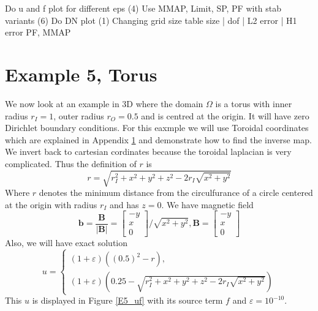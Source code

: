 \documentclass[12pt,a4paper]{article}
\begin{document}
Do u and f plot for different eps (4)
Use MMAP, Limit, SP, PF
with stab variants (6)
Do DN plot (1)
Changing grid size table 
size | dof | L2 error | H1 error PF, MMAP

\section{Example 5, Torus}
We now look at an example in 3D where the domain $\Omega $ is a torus with inner radius $r_I = 1$, outer radius $r_O = 0.5$ and is centred at the origin. It will have zero Dirichlet boundary conditions. For this eaxmple we will use Toroidal coordinates which are explained in Appendix \ref{} and demonstrate how to find the inverse map. We invert back to cartesian cordinates because the toroidal laplacian \cite{} is very complicated. Thus the definition of $r$ is
\begin{equation}
r = \sqrt{r_I^2 + x^2 + y^2 + z^2 -2r_I\sqrt{x^2+y^2}}
\end{equation}
Where $r$ denotes the minimum distance from the circulfurance of a circle centered at the origin with radius $r_I$ and has $z=0$. We have magnetic field 
\begin{equation}
\mathbf{b} = \frac{\mathbf{B}}{|\mathbf{B}|} = 
\left[ \begin{matrix}
-y\\
 x \\
 0
\end{matrix} \right]/\sqrt{x^2+y^2}, 
\mathbf{B} = \left[ \begin{matrix}
-y\\
 x\\
 0
\end{matrix} \right]
\end{equation}
Also, we will have exact solution
\begin{equation}
u = 
\begin{cases}
(1+\varepsilon)((0.5)^2 - r ),\\
(1+\varepsilon)(0.25 -  \sqrt{r_I^2 + x^2 + y^2 + z^2 -2r_I\sqrt{x^2+y^2}})
\end{cases}
\end{equation}
This $u$ is displayed in Figure \ref{E5_uf} with its source term $f$ and $\varepsilon=10^{-10}$.
\end{document}
